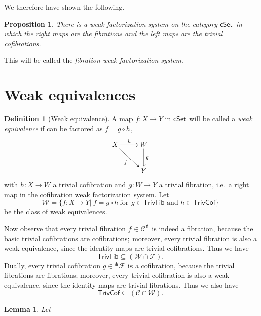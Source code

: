 \documentclass[11pt]{article}
\newcommand{\cSet}{\ensuremath{\mathsf{cSet}}}
\newcommand{\ra}{\ensuremath{\rightarrow}}
\newtheorem{proposition}[theorem]{Proposition}
\newtheorem{lemma}[theorem]{Lemma}
\theoremstyle{remark}
\theoremstyle{definition}
\newtheorem{definition}[theorem]{Definition}
\begin{document}
We therefore have shown the following.

\begin{proposition}
There is a weak factorization system on the category \cSet\ in which the right maps are the fibrations and the left maps are the trivial cofibrations.
\end{proposition}

This will be called the \emph{fibration weak factorization system}.

\section{Weak equivalences}

\begin{definition}[Weak equivalence]
A map $f: X\to Y$ in \cSet\ will be called a \emph{weak equivalence} if can be factored as $f  = g\circ h$,
\begin{equation*}%
\xymatrix{
X \ar[rd]_{f} \ar[r]^h & W\ar[d]^g\\
& Y
}
\end{equation*}
with $h: X\ra W$ a trivial cofibration and $g: W\ra Y$ a trivial fibration, i.e.\ a right map in the cofibration weak factorization system. Let 
\[
\mathcal{W} = \{f: X\to Y |\ f = g\circ h\ \text{for $g\in\mathsf{TrivFib}$ and $h\in\mathsf{TrivCof}$} \}
\]
 be the class of weak equivalences.
\end{definition}

Now observe that every trivial fibration $f\in\mathcal{C}^\pitchfork$ is indeed a fibration, because the basic trivial cofibrations are cofibrations; moreover, every trivial fibration is also a weak equivalence, since the identity maps are trivial cofibrations.  Thus we have
\[
\mathsf{TrivFib} \subseteq (\mathcal{W} \cap \mathcal{F}).
\]
Dually, every trivial cofibration $g\in{^{\pitchfork}\mathcal{F}}$ is a cofibration, because the trivial fibrations are fibrations; moreover, every trivial cofibration is also a weak equivalence, since the identity maps are trivial fibrations.  Thus we also have
\[
\mathsf{TrivCof} \subseteq (\mathcal{C} \cap \mathcal{W}).
\]

\begin{lemma}
Let 
\end{lemma}


\end{document}
